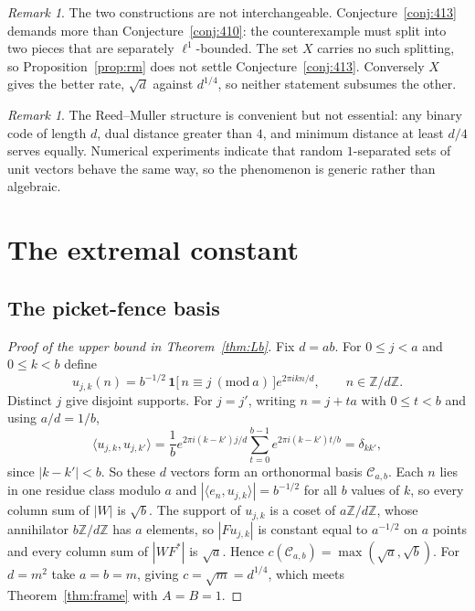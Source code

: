 \documentclass[11pt,reqno]{amsart}
\theoremstyle{plain}
\theoremstyle{definition}
\theoremstyle{remark}
\newtheorem{remark}[theorem]{Remark}
\newcommand{\Z}{\mathbb{Z}}
\newcommand{\one}{\mathbf{1}}
\begin{document}
\begin{remark}\label{rem:whyboth}
The two constructions are not interchangeable.
Conjecture~\ref{conj:413} demands more than
Conjecture~\ref{conj:410}: the counterexample must split into two pieces
that are separately $\ell^1$-bounded.  The set $X$ carries no such
splitting, so Proposition~\ref{prop:rm} does not settle
Conjecture~\ref{conj:413}.  Conversely $X$ gives the better rate,
$\sqrt d$ against $d^{1/4}$, so neither statement subsumes the other.
\end{remark}

\begin{remark}
The Reed--Muller structure is convenient but not essential: any binary
code of length $d$, dual distance greater than $4$, and minimum distance
at least $d/4$ serves equally.  Numerical experiments indicate that
random $1$-separated sets of unit vectors behave the same way, so the
phenomenon is generic rather than algebraic.
\end{remark}

\section{The extremal constant}\label{sec:Lb}

\subsection{The picket-fence basis}

\begin{proof}[Proof of the upper bound in Theorem~\textup{\ref{thm:Lb}}]
Fix $d=ab$.  For $0\le j<a$ and $0\le k<b$ define
\begin{equation}\label{eq:comb}
  u_{j,k}(n)=b^{-1/2}\,
  \one\bigl[\,n\equiv j\ (\mathrm{mod}\ a)\,\bigr]e^{2\pi ikn/d},
  \qquad n\in\Z/d\Z .
\end{equation}
Distinct $j$ give disjoint supports.  For $j=j'$, writing $n=j+ta$ with
$0\le t<b$ and using $a/d=1/b$,
\[
  \langle u_{j,k},u_{j,k'}\rangle
  =\frac1b e^{2\pi i(k-k')j/d}\sum_{t=0}^{b-1}e^{2\pi i(k-k')t/b}
  =\delta_{kk'},
\]
since $|k-k'|<b$.  So these $d$ vectors form an orthonormal basis
$\mathcal{C}_{a,b}$.  Each $n$ lies in one residue class modulo $a$ and
$|\langle e_n,u_{j,k}\rangle|=b^{-1/2}$ for all $b$ values of $k$, so
every column sum of $|W|$ is $\sqrt b$.  The support of $u_{j,k}$ is a
coset of $a\Z/d\Z$, whose annihilator $b\Z/d\Z$ has $a$ elements, so
$|Fu_{j,k}|$ is constant equal to $a^{-1/2}$ on $a$ points and every
column sum of $|WF^{*}|$ is $\sqrt a$.  Hence
$c(\mathcal{C}_{a,b})=\max(\sqrt a,\sqrt b)$.  For $d=m^2$ take $a=b=m$,
giving $c=\sqrt m=d^{1/4}$, which meets Theorem~\ref{thm:frame} with
$A=B=1$.
\end{proof}
\end{document}

